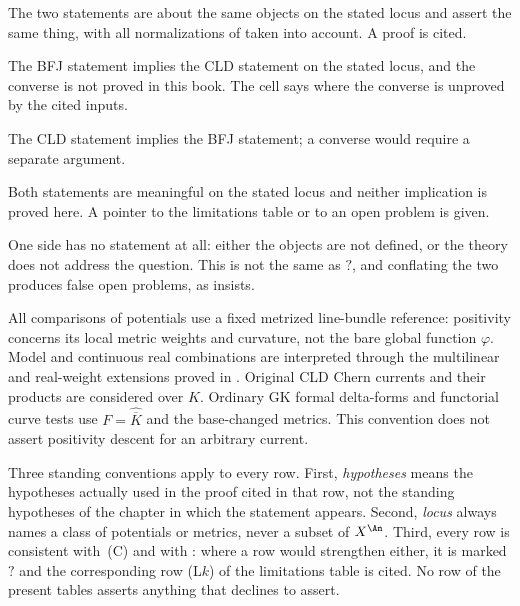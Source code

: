 \begin{description}[style=nextline,leftmargin=0pt,labelindent=0pt,
  labelsep=0pt,itemsep=.3\baselineskip,font=\normalfont\bfseries]
\item[$=$ equality]
The two statements are about the same objects on the stated locus and assert
the same thing, with all normalizations of  taken
into account.  A proof is cited.
\item[$\Rightarrow$ one-way implication]
The BFJ statement implies the CLD statement on the stated locus, and the
converse is not proved in this book.  The cell says where the converse is unproved by the cited inputs.
\item[$\Leftarrow$ one-way implication]
The CLD statement implies the BFJ statement; a converse would require
a separate argument.
\item[$?$ unknown]
Both statements are meaningful on the stated locus and neither implication
is proved here.  A pointer to the limitations table or to an open problem is
given.
\item[$\varnothing$ no counterpart]
One side has no statement at all: either the objects are not defined, or the
theory does not address the question.  This is not the same as $?$, and
conflating the two produces false open problems, as
 insists.
\end{description}

All comparisons of potentials use a fixed metrized line-bundle
reference: positivity concerns its local metric weights and curvature,
not the bare global function $\varphi$.  Model and continuous real
combinations are interpreted through the multilinear and real-weight
extensions proved in .  Original CLD
Chern currents and their products are considered over $K$.  Ordinary GK
formal delta-forms and functorial curve tests use
$F=\widehat{\overline K}$ and the base-changed metrics.  This convention
does not assert positivity descent for an arbitrary current.

Three standing conventions apply to every row.  First, \emph{hypotheses}
means the hypotheses actually used in the proof cited in that row, not the
standing hypotheses of the chapter in which the statement appears.  Second,
\emph{locus} always names a class of potentials or metrics, never a subset
of $X^{\An}$.  Third, every row is consistent with
\,(C) and with
: where a row would strengthen either, it
is marked $?$ and the corresponding row \textup{(L$k$)} of the
limitations table is cited.  No row of the present tables asserts anything
that  declines to assert.

